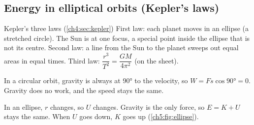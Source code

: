 \subsection{Energy in elliptical orbits (Kepler's laws)}

\begin{refresher}{Kepler's three laws (\cref{ch4:sec:kepler})}
First law: each planet moves in an ellipse (a stretched circle). The Sun is at
one focus, a special point inside the ellipse that is not its centre.
Second law: a line from the Sun to the planet sweeps out equal areas in equal
times. Third law: $\dfrac{r^3}{T^2} = \dfrac{GM}{4\pi^2}$ (on the sheet).
\end{refresher}

In a circular orbit, gravity is always at \ang{90} to the velocity, so
$W = Fs\cos\ang{90} = 0$. Gravity does no work, and the speed stays the same.

In an ellipse, $r$ changes, so $U$ changes. Gravity is the only force, so
$E = K + U$ stays the same. When $U$ goes down, $K$ goes up
(\cref{ch5:fig:ellipse}).

